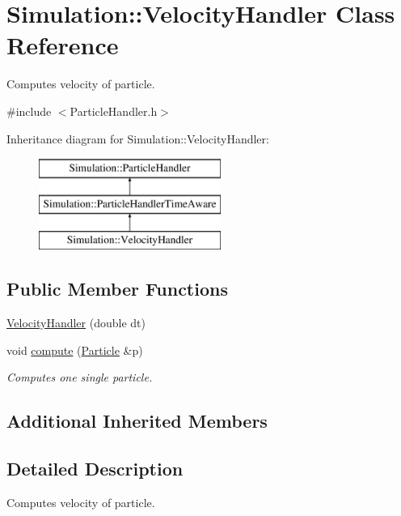 \hypertarget{classSimulation_1_1VelocityHandler}{\section{Simulation\-:\-:Velocity\-Handler Class Reference}
\label{classSimulation_1_1VelocityHandler}
}


Computes velocity of particle.  




{\ttfamily \#include $<$Particle\-Handler.\-h$>$}

Inheritance diagram for Simulation\-:\-:Velocity\-Handler\-:\begin{figure}[H]
\begin{center}
\leavevmode
\includegraphics[height=3.000000cm]{classSimulation_1_1VelocityHandler}
\end{center}
\end{figure}
\subsection*{Public Member Functions}
\begin{DoxyCompactItemize}
\item 
\hyperlink{classSimulation_1_1VelocityHandler_abc1da55bdd583040c3fefa6af2b94357}{Velocity\-Handler} (double dt)
\item 
void \hyperlink{classSimulation_1_1VelocityHandler_a5ddac3276478a84466bc7bf3e495b6bb}{compute} (\hyperlink{classSimulation_1_1Particle}{Particle} \&p)
\begin{DoxyCompactList}\small\item\em Computes one single particle. \end{DoxyCompactList}\end{DoxyCompactItemize}
\subsection*{Additional Inherited Members}


\subsection{Detailed Description}
Computes velocity of particle. 

